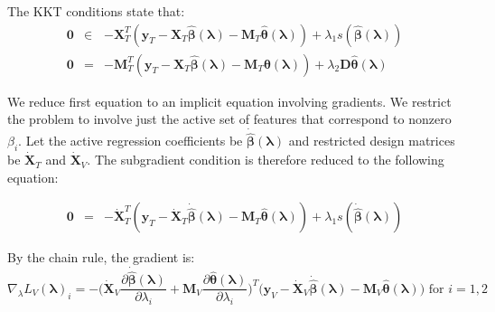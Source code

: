 \documentclass[10pt,letterpaper]{article}
\begin{document}
The KKT conditions state that:
\begin{equation}
\begin{array}{lcl}
\boldsymbol{0} &\in&
-\boldsymbol{X}_T^T(\boldsymbol{y}_T -
\boldsymbol{X}_T \hat{\boldsymbol{\beta}}(\boldsymbol{\lambda}) - \boldsymbol{M}_T \hat{\boldsymbol{\theta}}(\boldsymbol{\lambda}))
+ \lambda_1 s(\hat{\boldsymbol{\beta}}(\boldsymbol{\lambda})) \\
\boldsymbol{0} &=&
-\boldsymbol{M}_T^T(\boldsymbol{y}_T
- \boldsymbol{X}_T \hat{\boldsymbol{\beta}}(\boldsymbol{\lambda})
- \boldsymbol{M}_T \boldsymbol{\theta}(\boldsymbol{\lambda}))
+ \lambda_2 \boldsymbol{D} \hat{\boldsymbol{\theta}}(\boldsymbol{\lambda})
\end{array}
\end{equation}

We reduce first equation to an implicit equation involving gradients. We restrict the problem to involve just the active set of features that correspond to nonzero $\beta_i$. Let the active regression coefficients be $\dot{\hat{\boldsymbol{\beta}}}(\boldsymbol{\lambda})$ and restricted design matrices be $\dot{\boldsymbol{X}}_T$ and $\dot{\boldsymbol{X}}_V$. The subgradient condition is therefore reduced to the following equation:

\begin{equation}
\begin{array}{lcl}
\boldsymbol{0} &=&
-\dot{\boldsymbol{X}}_T^T(\boldsymbol{y}_T
- \dot{\boldsymbol{X}}_T \dot{\hat{\boldsymbol{\beta}}}(\boldsymbol{\lambda})
- \boldsymbol{M}_T \hat{\boldsymbol{\theta}}(\boldsymbol{\lambda}))
+ \lambda_1 s(\dot{\hat{\boldsymbol{\beta}}}(\boldsymbol{\lambda}))
\end{array}
\end{equation}

By the chain rule, the gradient is:
\begin{equation}
\nabla_\lambda L_V(\boldsymbol{\lambda})_i =
- \bigg(
\dot{\boldsymbol{X}}_V \frac{\partial \dot{\hat{\boldsymbol{\beta}}}(\boldsymbol{\lambda})}{\partial \lambda_i}
+ \boldsymbol{M}_V \frac{\partial \hat{\boldsymbol{\theta}}(\boldsymbol{\lambda})}{\partial \lambda_i}
\bigg )^T
\bigg (
\boldsymbol{y}_V
- \dot{\boldsymbol{X}}_V \dot{\hat{\boldsymbol{\beta}}}(\boldsymbol{\lambda})
- \boldsymbol{M}_V\hat{\boldsymbol{\theta}}(\boldsymbol{\lambda})
\bigg )
\text{ for } i = 1,2 
\end{equation}
\end{document}
